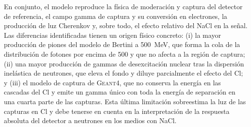 En conjunto, el modelo reproduce la física de moderación y captura del detector de referencia, el campo gamma de captura y su conversión en electrones, la producción de luz Cherenkov y, sobre todo, el efecto relativo del NaCl en la señal. Las diferencias identificadas tienen un origen físico concreto: (i) la mayor producción de piones del modelo de Bertini a 500~MeV, que forma la cola de la distribución de fotones por encima de 500 y que no afecta a la región de captura; (ii) una mayor producción de gammas de desexcitación nuclear tras la dispersión inelástica de neutrones, que eleva el fondo y diluye parcialmente el efecto del Cl; y (iii) el modelo de captura de \textsc{Geant4}, que no conserva la energía en las cascadas del Cl y emite un gamma único con toda la energía de separación en una cuarta parte de las capturas. Esta última limitación sobreestima la luz de las capturas en Cl y debe tenerse en cuenta en la interpretación de la respuesta absoluta del detector a neutrones en los medios con NaCl.
